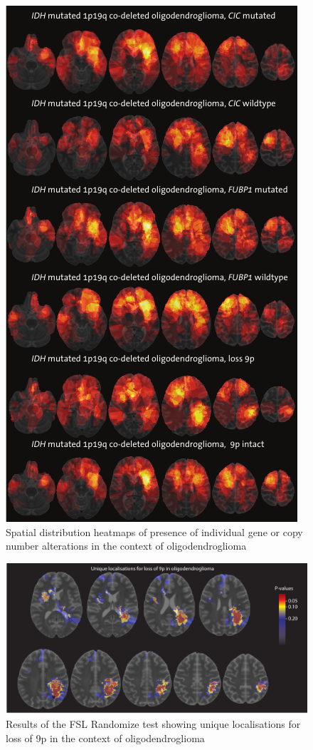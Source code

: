 \begin{subappendices}
    \begin{figure}[htb]
        \centering
        \includegraphics[height=\textheight]{Figures/heatmap_multi_parameter.png}
        \caption{Spatial distribution heatmaps of presence of individual gene or copy number alterations in the context of oligodendroglioma}\label{fig:LGG_location_heatmap_multi_genetics}
    \end{figure}

    \begin{figure}[htb]
        \centering
        \includegraphics[width=\textwidth]{Figures/p_value_9p.png}
        \caption{Results of the FSL Randomize test showing unique localisations for loss of 9p in the context of oligodendroglioma}\label{fig:LGG_location_p_value_9p}
    \end{figure}
\end{subappendices}
